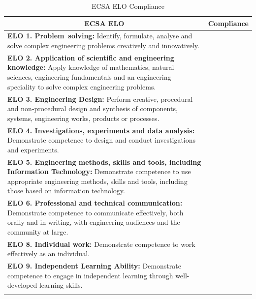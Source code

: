 \documentclass[12pt,a4paper]{report}
\begin{document}
\begin{longtable}[c]{|m{}|m{}|}
	\hline
	\multicolumn{1}{|c|}{\textbf{ECSA ELO}} & \multicolumn{1}{c|}{\textbf{Compliance}} \\
	\hline
	\endhead
	
	
	\textbf{ELO 1. Problem solving:} \newline Identify, formulate, analyse and solve complex engineering problems creatively and innovatively.&  \\
	\hline
	\textbf{ELO 2. Application of scientific and engineering knowledge:} \newline Apply knowledge of mathematics, natural sciences, engineering fundamentals and an engineering speciality to solve complex engineering problems.&  \\
	\hline
	\textbf{ELO 3. Engineering Design:} \newline Perform creative, procedural and non‐procedural design and synthesis of components, systems, engineering works, products or processes.&  \\
	\hline
	\textbf{ELO 4. Investigations, experiments and data analysis:} \newline Demonstrate competence to design and conduct investigations and experiments. &  \\
	\hline
	\textbf{ELO 5. Engineering methods, skills and tools, including Information Technology:} \newline Demonstrate competence to use appropriate engineering methods, skills and tools, including those based on information technology.&  \\
	\hline
	\textbf{ELO 6. Professional and technical communication:} \newline Demonstrate competence to communicate effectively, both orally and in writing, with engineering audiences and the community at large.&  \\
	\hline
	\textbf{ELO 8. Individual work:} \newline Demonstrate competence to work effectively as an individual.&  \\
	\hline
	\textbf{ELO 9. Independent Learning Ability:} \newline Demonstrate competence to engage in independent learning through well-developed learning skills.&  \\
	\hline
	
	\caption{ECSA ELO Compliance}
	\label{tab:ecsa}%
\end{longtable}%
	
\end{document}
